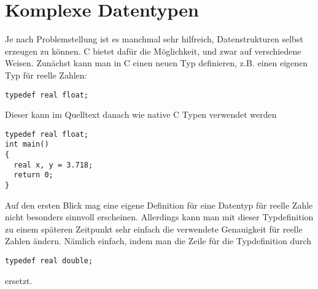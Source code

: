 \section{Komplexe Datentypen}

Je nach Problemstellung ist es manchmal sehr hilfreich, Datenstrukturen selbst erzeugen zu können.
C bietet dafür die Möglichkeit, und zwar auf verschiedene Weisen.
Zunächst kann man in C einen neuen Typ definieren, z.B. einen eigenen Typ für reelle Zahlen:
\begin{lstlisting}
typedef real float;
\end{lstlisting}
Dieser kann im Quelltext danach wie native C Typen verwendet werden
\begin{lstlisting}
typedef real float;
int main()
{
  real x, y = 3.718;
  return 0;
}
\end{lstlisting}
Auf den ersten Blick mag eine eigene Definition für eine Datentyp für reelle Zahle nicht besonders sinnvoll erscheinen.
Allerdings kann man mit dieser Typdefinition zu einem späteren Zeitpunkt sehr einfach die verwendete Genauigkeit für reelle Zahlen ändern.
Nämlich einfach, indem man die Zeile für die Typdefinition durch
\begin{lstlisting}
typedef real double;
\end{lstlisting}
ersetzt.

